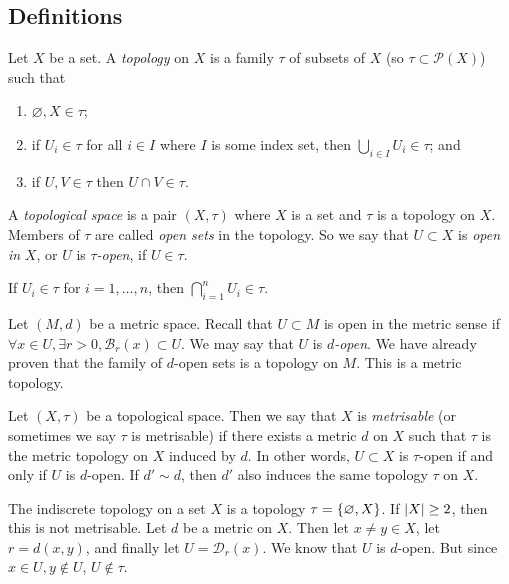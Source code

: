 \subsection{Definitions}
\begin{definition}
	Let \( X \) be a set.
	A \textit{topology} on \( X \) is a family \( \tau \) of subsets of \( X \) (so \( \tau \subset \mathcal P(X) \)) such that
	\begin{enumerate}
		\item \( \varnothing, X \in \tau \);
		\item if \( U_i \in \tau \) for all \( i \in I \) where \( I \) is some index set, then \( \bigcup_{i \in I} U_i \in \tau \); and
		\item if \( U, V \in \tau \) then \( U \cap V \in \tau \).
	\end{enumerate}
	A \textit{topological space} is a pair \( (X, \tau) \) where \( X \) is a set and \( \tau \) is a topology on \( X \).
	Members of \( \tau \) are called \textit{open sets} in the topology.
	So we say that \( U \subset X \) is \textit{open in} \( X \), or \( U \) is \( \tau \)\textit{-open}, if \( U \in \tau \).
\end{definition}
\begin{remark}
	If \( U_i \in \tau \) for \( i = 1, \dots, n \), then \( \bigcap_{i=1}^n U_i \in \tau \).
\end{remark}
\begin{example}
	Let \( (M, d) \) be a metric space.
	Recall that \( U \subset M \) is open in the metric sense if \( \forall x \in U, \exists r > 0, \mathcal B_r(x) \subset U \).
	We may say that \( U \) is \( d \)\textit{-open}.
	We have already proven that the family of \( d \)-open sets is a topology on \( M \).
	This is a metric topology.
\end{example}
\begin{definition}
	Let \( (X, \tau) \) be a topological space.
	Then we say that \( X \) is \textit{metrisable} (or sometimes we say \( \tau \) is metrisable) if there exists a metric \( d \) on \( X \) such that \( \tau \) is the metric topology on \( X \) induced by \( d \).
	In other words, \( U \subset X \) is \( \tau \)-open if and only if \( U \) is \( d \)-open.
	If \( d' \sim d \), then \( d' \) also induces the same topology \( \tau \) on \( X \).
\end{definition}
\begin{example}
	The indiscrete topology on a set \( X \) is a topology \( \tau = \qty{ \varnothing, X } \).
	If \( \abs{X} \geq 2 \), then this is not metrisable.
	Let \( d \) be a metric on \( X \).
	Then let \( x \neq y \in X \), let \( r = d(x,y) \), and finally let \( U = \mathcal D_r(x) \).
	We know that \( U \) is \( d \)-open.
	But since \( x \in U, y \not\in U \), \( U \not\in \tau \).
\end{example}

